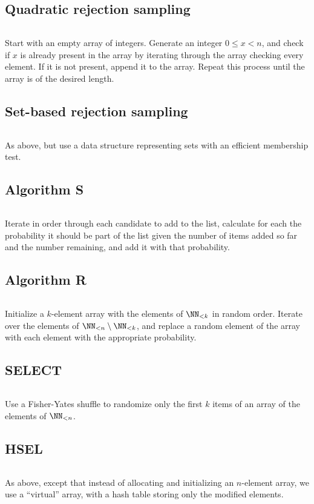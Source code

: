 \documentclass[letterpaper,luatex,11pt]{article}
\begin{document}
\subsection{Quadratic rejection sampling}
\inputminted{Python}{code/quadraticreject.py}
Start with an empty array of integers. Generate an integer
\(0 \leq x < n\), and check if \(x\) is already present in the array
by iterating through the array checking every element. If it is not present,
append it to the array. Repeat this process until the array is of the desired length.

\subsection{Set-based rejection sampling}
\inputminted{Python}{code/rejectionsample.py}
As above, but use a data structure representing sets with an efficient membership test.
\cite{goodman}

\subsection{Algorithm S}
\inputminted{Python}{code/iterativechoose.py}
Iterate in order through each candidate to add to the list,
calculate for each the probability it should be part of the list given
the number of items added so far and the number remaining, and add
it with that probability.
\cite{taocp2}
\cite[Method 1, p.391]{fanetal}

\subsection{Algorithm R}
\inputminted{Python}{code/reservoirsample.py}
Initialize a \(k\)-element array with the elements of \(\NN_{<k}\)
in random order. Iterate over the elements of \(\NN_{<n} \setminus \NN_{<k}\),
and replace a random element of the array with each element with the
appropriate probability.
\cite{taocp2}

\subsection{SELECT}
\inputminted{Python}{code/select.py}
Use a Fisher-Yates shuffle to randomize only the first \(k\) items
of an array of the elements of \(\NN_{<n}\). \cite{goodman}

\subsection{HSEL}
\inputminted{Python}{code/hsel.py}
As above, except that instead of allocating and initializing an \(n\)-element array,
we use a ``virtual'' array, with a hash table storing only the modified elements.
\cite{hsel}
\end{document}
